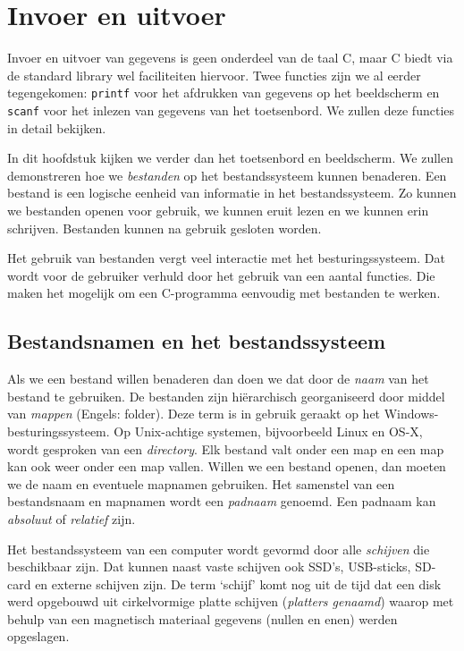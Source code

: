 \chapter{Invoer en uitvoer}
\label{cha:io}
\thispagestyle{empty}

Invoer en uitvoer van gegevens is geen onderdeel van de taal C, maar C biedt via de standard library wel faciliteiten hiervoor. Twee functies zijn we al eerder tegengekomen: \texttt{printf} voor het afdrukken van gegevens op het beeldscherm en \texttt{scanf} voor het inlezen van gegevens van het toetsenbord. We zullen deze functies in detail bekijken.

In dit hoofdstuk kijken we verder dan het toetsenbord en beeldscherm. We zullen demonstreren hoe we \textsl{bestanden} op het bestandssysteem kunnen benaderen. Een bestand is een logische eenheid van informatie in het bestandssysteem. Zo kunnen we bestanden openen voor gebruik, we kunnen eruit lezen en we kunnen erin schrijven. Bestanden kunnen na gebruik gesloten worden.

Het gebruik van bestanden vergt veel interactie met het besturingssysteem. Dat wordt voor de gebruiker verhuld door het gebruik van een aantal functies. Die maken het mogelijk om een C-programma eenvoudig met bestanden te werken.

\section{Bestandsnamen en het bestandssysteem}
Als we een bestand willen benaderen dan doen we dat door de \textsl{naam} van het bestand te gebruiken. De bestanden zijn hiërarchisch georganiseerd door middel van \textsl{mappen} (Engels: folder). Deze term is in gebruik geraakt op het Windows-besturingssysteem. Op Unix-achtige systemen, bijvoorbeeld Linux en OS-X, wordt gesproken van een \textsl{directory}. Elk bestand valt onder een map en een map kan ook weer onder een map vallen. Willen we een bestand openen, dan moeten we de naam en eventuele mapnamen gebruiken. Het samenstel van een bestandsnaam en mapnamen wordt een \textsl{padnaam} genoemd. Een padnaam kan \textsl{absoluut} of \textsl{relatief} zijn.

Het bestandssysteem van een computer wordt gevormd door alle \textsl{schijven} die beschikbaar zijn. Dat kunnen naast vaste schijven ook SSD's, USB-sticks, SD-card en externe schijven zijn. De term `schijf' komt nog uit de tijd dat een disk werd opgebouwd uit cirkelvormige platte schijven (\textsl{platters genaamd}) waarop met behulp van een magnetisch materiaal gegevens (nullen en enen) werden opgeslagen.

